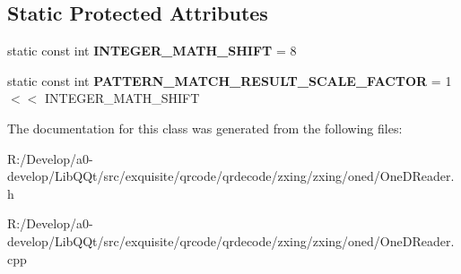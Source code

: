\subsection*{Static Protected Attributes}
\begin{DoxyCompactItemize}
\item 
\mbox{\label{classzxing_1_1oned_1_1_one_d_reader_a22ff0589a3af657acfbbd902bb674a29}} 
static const int {\bfseries I\+N\+T\+E\+G\+E\+R\+\_\+\+M\+A\+T\+H\+\_\+\+S\+H\+I\+FT} = 8
\item 
\mbox{\label{classzxing_1_1oned_1_1_one_d_reader_aaa277c8f2ad2041fc7a18feaa4fad7e4}} 
static const int {\bfseries P\+A\+T\+T\+E\+R\+N\+\_\+\+M\+A\+T\+C\+H\+\_\+\+R\+E\+S\+U\+L\+T\+\_\+\+S\+C\+A\+L\+E\+\_\+\+F\+A\+C\+T\+OR} = 1 $<$$<$ I\+N\+T\+E\+G\+E\+R\+\_\+\+M\+A\+T\+H\+\_\+\+S\+H\+I\+FT
\end{DoxyCompactItemize}


The documentation for this class was generated from the following files\+:\begin{DoxyCompactItemize}
\item 
R\+:/\+Develop/a0-\/develop/\+Lib\+Q\+Qt/src/exquisite/qrcode/qrdecode/zxing/zxing/oned/One\+D\+Reader.\+h\item 
R\+:/\+Develop/a0-\/develop/\+Lib\+Q\+Qt/src/exquisite/qrcode/qrdecode/zxing/zxing/oned/One\+D\+Reader.\+cpp\end{DoxyCompactItemize}
